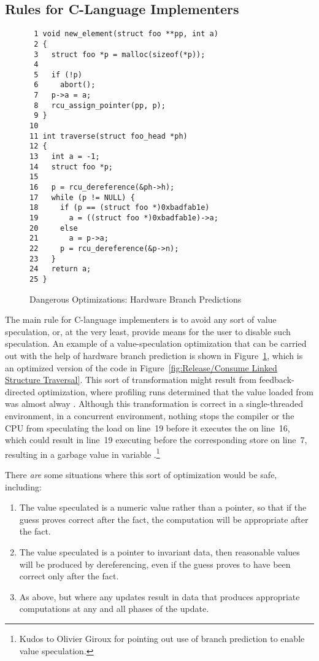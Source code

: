 \documentclass[letterpaper,twocolumn,10pt]{article}
\begin{document}
\subsection{Rules for C-Language Implementers}
\label{sec:Rules for C-Language Implementers}

\begin{figure}[tbp]
{ \scriptsize
\begin{verbatim}
 1 void new_element(struct foo **pp, int a)
 2 {
 3   struct foo *p = malloc(sizeof(*p));
 4 
 5   if (!p)
 6     abort();
 7   p->a = a;
 8   rcu_assign_pointer(pp, p);
 9 }
10 
11 int traverse(struct foo_head *ph)
12 {
13   int a = -1;
14   struct foo *p;
15 
16   p = rcu_dereference(&ph->h);
17   while (p != NULL) {
18     if (p == (struct foo *)0xbadfab1e)
19       a = ((struct foo *)0xbadfab1e)->a;
20     else
21       a = p->a;
22     p = rcu_dereference(&p->n);
23   }
24   return a;
25 }
\end{verbatim}
}
\caption{Dangerous Optimizations: Hardware Branch Predictions}
\label{fig:Dangerous Optimizations: Hardware Branch Predictions}
\end{figure}

The main rule for C-language implementers is to avoid any sort of
value speculation, or, at the very least, provide means for the user
to disable such speculation.
An example of a value-speculation optimization that can be carried
out with the help of hardware branch prediction is shown in
Figure~\ref{fig:Dangerous Optimizations: Hardware Branch Predictions},
which is an optimized version of the code in
Figure~\ref{fig:Release/Consume Linked Structure Traversal}.
This sort of transformation might result from feedback-directed
optimization, where profiling runs determined that the value
loaded from  was almost alway .
Although this transformation is correct in a single-threaded
environment, in a concurrent environment, nothing stops the compiler
or the CPU from speculating the load on line~19 before it executes the
 on line~16, which could result in line~19 executing
before the corresponding store on line~7, resulting in a garbage value
in variable .\footnote{
	Kudos to Olivier Giroux for pointing out use of branch
	prediction to enable value speculation.}

There \emph{are} some situations where this sort of optimization would be
safe, including:

\begin{enumerate}
\item	The value speculated is a numeric value rather than a pointer,
	so that if the guess proves correct after the fact, the computation
	will be appropriate after the fact.
\item	The value speculated is a pointer to invariant data, then
	reasonable values will be produced by dereferencing, even if the
	guess proves to have been correct only after the fact.
\item	As above, but where any updates result in data that produces
	appropriate computations at any and all phases of the update.
\end{enumerate}
\end{document}
